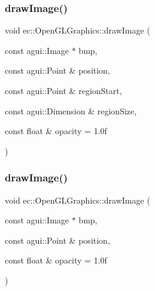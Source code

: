 \subsubsection{\texorpdfstring{draw\+Image()}{drawImage()}\hspace{0.1cm}{\footnotesize\ttfamily [1/2]}}
{\footnotesize\ttfamily void ec\+::\+Open\+G\+L\+Graphics\+::draw\+Image (\begin{DoxyParamCaption}\item[{const agui\+::\+Image $\ast$}]{bmp,  }\item[{const agui\+::\+Point \&}]{position,  }\item[{const agui\+::\+Point \&}]{region\+Start,  }\item[{const agui\+::\+Dimension \&}]{region\+Size,  }\item[{const float \&}]{opacity = {\ttfamily 1.0f} }\end{DoxyParamCaption})\hspace{0.3cm}{\ttfamily [override]}}

\mbox{\label{classec_1_1_open_g_l_graphics_acaff776ddbeb8d6e33c9044109d28f7a}} 
\subsubsection{\texorpdfstring{draw\+Image()}{drawImage()}\hspace{0.1cm}{\footnotesize\ttfamily [2/2]}}
{\footnotesize\ttfamily void ec\+::\+Open\+G\+L\+Graphics\+::draw\+Image (\begin{DoxyParamCaption}\item[{const agui\+::\+Image $\ast$}]{bmp,  }\item[{const agui\+::\+Point \&}]{position,  }\item[{const float \&}]{opacity = {\ttfamily 1.0f} }\end{DoxyParamCaption})\hspace{0.3cm}{\ttfamily [override]}}

\mbox{\label{classec_1_1_open_g_l_graphics_a174cd34243e20b2639ece416b4df3a6b}} 
